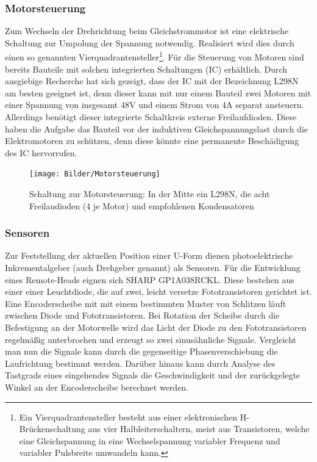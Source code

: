 \documentclass[a4paper, 12pt, bibtotocnumbered, liststotocnumbered]{scrartcl}
\begin{document}
	\subsubsection{Motorsteuerung}
	Zum Wechseln der Drehrichtung beim Gleichstrommotor ist eine elektrische Schaltung zur Umpolung der Spannung notwendig. Realisiert wird dies durch einen so genannten Vierquadrantensteller\footnote{Ein Vierquadrantensteller besteht aus einer elektronischen H-Brückenschaltung aus vier Halbleiterschaltern, meist aus Transistoren, welche eine Gleichspannung in eine Wechselspannung variabler Frequenz und variabler Pulsbreite umwandeln kann.}\cite{wikipedia-drehgeber}. Für die Steuerung von Motoren sind bereits Bauteile mit solchen integrierten Schaltungen (IC) erhältlich. Durch ausgiebige Recherche hat sich gezeigt, dass der IC mit der Bezeichnung L298N am besten geeignet ist, denn dieser kann mit nur einem Bauteil zwei Motoren mit einer Spannung von insgesamt 48V und einem Strom von 4A separat ansteuern. Allerdings benötigt dieser integrierte Schaltkreis externe Freilaufdioden. Diese haben die Aufgabe das Bauteil vor der induktiven Gleichspannungslast durch die Elektromotoren zu schützen, denn diese könnte eine permanente Beschädigung des IC hervorrufen.

	\begin{figure}[htb]
		\centering
		\texttt{[image: Bilder/Motorsteuerung]}
		\caption{Schaltung zur Motorsteuerung: In der Mitte ein L298N, die acht Freilaudioden (4 je Motor) und empfohlenen Kondensatoren}
	\end{figure}

	\subsubsection{Sensoren}
	Zur Feststellung der aktuellen Position einer U-Form dienen photoelektrische Inkrementalgeber (auch Drehgeber genannt) als Sensoren. Für die Entwicklung eines Remote-Heads eignen sich SHARP GP1A038RCKL\cite{inkrementalgeber}. Diese bestehen aus einer einer Leuchtdiode, die auf zwei, leicht versetze Fototransistoren gerichtet ist. Eine Encoderscheibe mit mit einem bestimmten Muster von Schlitzen läuft zwischen Diode und Fototransistoren. Bei Rotation der Scheibe durch die Befestigung an der Motorwelle wird das Licht der Diode zu den Fototransistoren regelmäßig unterbrochen und erzeugt so zwei sinusähnliche Signale. Vergleicht man nun die Signale kann durch die gegenseitige Phasenverschiebung die Laufrichtung bestimmt werden. Darüber hinaus kann durch Analyse des Tastgrads eines eingehendes Signals die Geschwindigkeit und der zurückgelegte Winkel an der Encoderscheibe berechnet werden.
\end{document}

